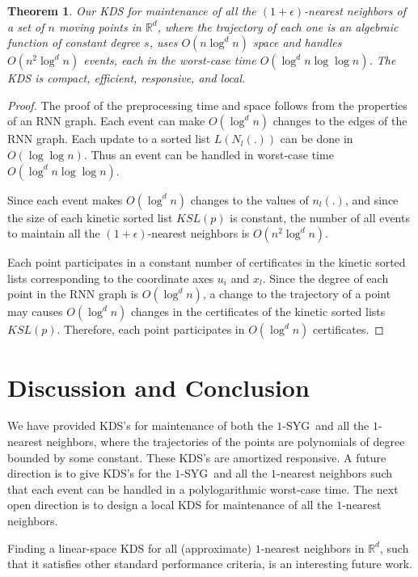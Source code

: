 \documentclass[preprint,12pt]{elsarticle}
\def\1syg{\mbox{$1$-SYG}}
\newtheorem{theorem}{Theorem}[section]
\begin{document}
\begin{theorem}\label{the:KinEpsANN}
Our KDS for maintenance of all the $(1+\epsilon)$-nearest neighbors of a set of $n$ moving points in $\mathbb{R}^d$, where the trajectory of each one is an algebraic function of constant degree $s$, uses $O(n\log^{d} n)$ space and handles $O(n^2\log^d n)$ events, each in the worst-case time $O(\log^d n\log\log n)$. The KDS is compact, efficient, responsive, and local.
\end{theorem}
\begin{proof}
The proof of the preprocessing time and space follows from the properties of an RNN graph. Each event can make $O(\log^d n)$ changes to the edges of the RNN graph. Each update to a sorted list $L(N_l(.))$ can be done in $O(\log\log n)$. Thus an event can be handled in worst-case time $O(\log^dn\log\log n)$.

Since each event makes $O(\log^d n)$ changes to the values of $n_l(.)$, and since the size of each kinetic sorted list $KSL(p)$ is constant, the number of all events to maintain all the $(1+\epsilon)$-nearest neighbors is $O(n^2\log^d n)$.

Each point participates in a constant number of certificates in the kinetic sorted lists corresponding to the coordinate axes $u_i$ and $x_l$. Since the degree of each point in the RNN graph is $O(\log^d n)$, a change to the trajectory of a point may causes $O(\log^d n)$ changes in the certificates of the kinetic sorted lists $KSL(p)$. Therefore, each point participates in $O(\log^d n)$ certificates.
\end{proof}
\section{Discussion and Conclusion}\label{sec:conclusion}
We have provided KDS's for  maintenance of both the \1syg~and all the $1$-nearest neighbors, where the trajectories of the points are polynomials of degree bounded by some constant. These KDS's are amortized responsive. A future direction is to give KDS's for the \1syg~and all the $1$-nearest neighbors such that each event can be handled in a polylogarithmic worst-case time. The next open direction is to design a local KDS for maintenance of all the $1$-nearest neighbors.

Finding a linear-space KDS for all (approximate) $1$-nearest neighbors in $\mathbb{R}^d$, such that it satisfies other standard performance criteria, is an interesting future work.
\end{document}
